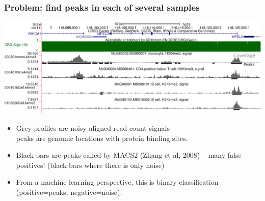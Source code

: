 \documentclass{beamer}
\begin{document}
\begin{frame}
  \frametitle{Problem: find peaks in each of several samples}
  \includegraphics[width=\textwidth]{screenshot-ucsc-edited}

  \begin{itemize}
  \item Grey profiles are noisy aligned read count signals -- \\peaks
    are genomic locations with protein binding sites.
  \item Black bars are peaks called by MACS2 (Zhang et al, 2008) -- many
    false positives! (black bars where there is only noise)
  \item From a machine learning perspective, this is binary
    classification (positive=peaks, negative=noise).
  \end{itemize}
\end{frame}

\end{document}

